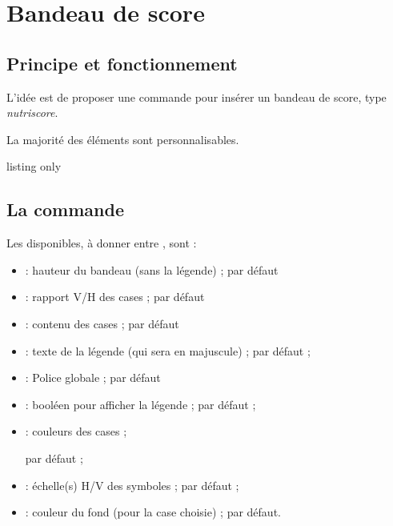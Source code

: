 \documentclass[french,11pt,a4paper]{article}
\begin{document}
\pagebreak

\section{Bandeau de score}

\subsection{Principe et fonctionnement}

L'idée est de proposer une commande pour insérer un bandeau de score, type \textit{nutriscore}.

\smallskip

La majorité des éléments sont personnalisables.

\begin{DemoCode}{listing only}
\end{DemoCode}

\begin{DemoCode}{}
\BandeauScore{}
\end{DemoCode}

\subsection{La commande}

Les  disponibles, à donner entre \MontreCode{[...]}, sont :

\begin{itemize}
	\item {} : hauteur du bandeau (sans la légende) ;  par défaut
	\item {} : rapport V/H des cases ;  par défaut
	\item {} : contenu des cases ;  par défaut
	\item {} : texte de la légende (qui sera en majuscule) ;  par défaut ;
	\item {} : Police globale ;  par défaut
	\item {} : booléen pour afficher la légende ;   par défaut ;
	\item {} : couleurs des cases ;
	
	\hfill{} par défaut ;
	\item {} : échelle(s) H/V des symboles ;   par défaut ;
	\item {} : couleur du fond (pour la case choisie)  ;   par défaut.
\end{itemize}
\end{document}
